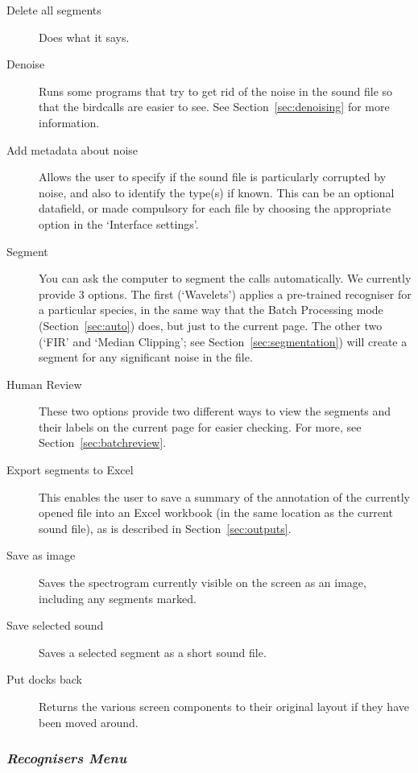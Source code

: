 \documentclass{article}
\begin{document}
\begin{description}
\item [Delete all segments] Does what it says. 
\item [Denoise] Runs some programs that try to get rid of the noise in the sound file so that the birdcalls are easier to see. See Section~\ref{sec:denoising} for more information.
\item [Add metadata about noise] Allows the user to specify if the sound file is particularly corrupted by noise, and also to identify the type(s) if known. This can be an optional datafield, or made compulsory for each file by choosing the appropriate option in the `Interface settings'.
\item [Segment] You can ask the computer to segment the calls automatically. We currently provide 3 options. The first (`Wavelets') applies a pre-trained recogniser for a particular species, in the same way that the Batch Processing mode (Section~\ref{sec:auto}) does, but just to the current page. The other two (`FIR' and `Median Clipping'; see Section~\ref{sec:segmentation}) will create a segment for any significant noise in the file. 
\item [Human Review] These two options provide two different ways to view the segments and their labels on the current page for easier checking. For more, see Section~\ref{sec:batchreview}.
\item [Export segments to Excel] This enables the user to save a summary of the annotation of the currently opened file into an Excel workbook (in the same location as the current sound file), as is described in Section~\ref{sec:outputs}. 
\item [Save as image] Saves the spectrogram currently visible on the screen as an image, including any segments marked. 
\item [Save selected sound] Saves a selected segment as a short sound file.
\item [Put docks back] Returns the various screen components to their original layout if they have been moved around. 
\end{description}

\subsubsection{{\em Recognisers Menu}}
\end{document}
